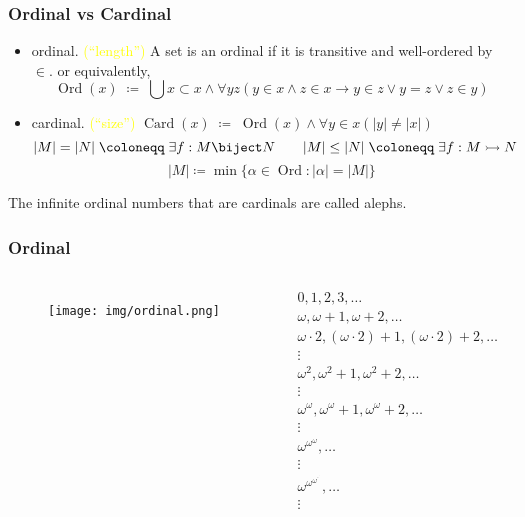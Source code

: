 \documentclass[UTF8,aspectratio=43,11pt,colorlinks,compress,openany]{beamer}%
\begin{document}
\begin{frame}\frametitle{Ordinal vs Cardinal}
	\begin{itemize}
		\item ordinal. \textcolor{yellow}{(``length'')} A set is an ordinal if it is transitive and well-ordered by $\in$. or equivalently,
		\[\operatorname{Ord}(x)\;\coloneqq \;\bigcup x\subset x\wedge\forall yz(y\in x\wedge z\in x\to y\in z\vee y=z\vee z\in y)\]
		\item cardinal. \textcolor{yellow}{(``size'')}\quad
		$\operatorname{Card}(x)\;\coloneqq \;\operatorname{Ord}(x)\wedge\forall y\in x(|y|\neq|x|)$
		\[|M|=|N|\;\coloneqq \;\exists f: M\biject N\qquad |M|\leq|N|\;\coloneqq \;\exists f: M\rightarrowtail N\]
		\[|M|\coloneqq \min\{\alpha\in \operatorname{Ord}: |\alpha|=|M|\}\]
	\end{itemize}
	The infinite ordinal numbers that are cardinals are called alephs.
\end{frame}

\begin{frame}\frametitle{Ordinal}
	\begin{columns}
		\vspace{-11pt}
			\begin{figure}
				\texttt{[image: img/ordinal.png]}
			\end{figure}
			\vspace{-15pt}
			\begin{align*}
			&0, 1, 2, 3,\dots\\
			&\omega, \omega+1, \omega+2,\dots\\
			&\omega\cdot 2, (\omega \cdot 2)+1, (\omega \cdot 2)+2,\dots\\
			&\vdots\\
			&\omega^2, \omega^2+1, \omega^2+2,\dots\\
			&\vdots\\
			&\omega^{\omega}, \omega^{\omega}+1, \omega^{\omega}+2,\dots\\
			&\vdots\\
			&\omega^{\omega^{\omega}},\dots\\
			&\vdots\\
			&\omega^{\omega^{\omega^{\cdot^{\cdot^{\cdot}}}}},\dots\\
			&\vdots
			\end{align*}
	\end{columns}
\end{frame}
\end{document}
